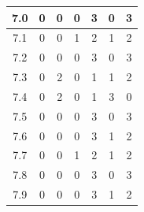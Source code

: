\documentclass[11pt]{jreport}
\begin{document}
\begin{table}[H]
{\begin{tabular}{c|c|c|c|c|c|c}
    \hline
    7.0 & 0 & 0 & 0 & 3 & 0 & 3 \\
    \hline
    7.1 & 0 & 0 & 1 & 2 & 1 & 2 \\
    \hline
    7.2 & 0 & 0 & 0 & 3 & 0 & 3 \\
    \hline
    7.3 & 0 & 2 & 0 & 1 & 1 & 2 \\
    \hline
    7.4 & 0 & 2 & 0 & 1 & 3 & 0 \\
    \hline
    7.5 & 0 & 0 & 0 & 3 & 0 & 3 \\
    \hline
    7.6 & 0 & 0 & 0 & 3 & 1 & 2 \\
    \hline
    7.7 & 0 & 0 & 1 & 2 & 1 & 2 \\
    \hline
    7.8 & 0 & 0 & 0 & 3 & 0 & 3 \\
    \hline
    7.9 & 0 & 0 & 0 & 3 & 1 & 2 \\
    \hline
    \end{tabular}
    }
\end{table} 
\end{document}
